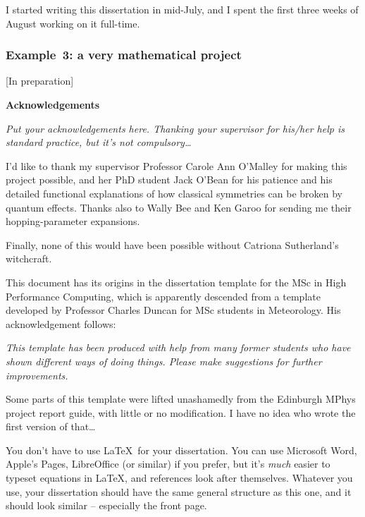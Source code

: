 \documentclass[12pt,a4paper]{report}
\begin{document}
I started writing this dissertation in mid-July, and I spent the first
three weeks of August working on it full-time.



\subsubsection{Example~3: a very mathematical project}

[In preparation]



\newpage

\begin{center}
\textbf{Acknowledgements}
\end{center}

\emph{Put your acknowledgements here. Thanking your supervisor for his/her help is standard practice, but it's not compulsory\ldots}

I'd like to thank my supervisor Professor Carole Ann O'Malley for
making this project possible, and her PhD student Jack O'Bean for his
patience and his detailed functional explanations of how classical
symmetries can be broken by quantum effects. Thanks also to Wally Bee
and Ken Garoo for sending me their hopping-parameter expansions.

Finally, none of this would have been possible without Catriona
Sutherland's witchcraft.

\bigskip

This document has its origins in the dissertation template for the MSc
in High Performance Computing, which is apparently descended from a
template developed by Professor Charles Duncan for MSc students in
Meteorology. His acknowledgement follows:

\emph{This template has been produced with help from many former
  students who have shown different ways of doing things. Please make
  suggestions for further improvements.}

Some parts of this template were lifted unashamedly from the Edinburgh
MPhys project report guide, with little or no modification. I have no
idea who wrote the first version of that\ldots

You don't have to use \LaTeX\ for your dissertation. You can use
Microsoft Word, Apple's Pages, LibreOffice (or similar) if you prefer, but
it's \emph{much} easier to typeset equations in \LaTeX, and references
look after themselves. Whatever you use, your dissertation should have
the same general structure as this one, and it should look similar --
especially the front page.
\end{document}

